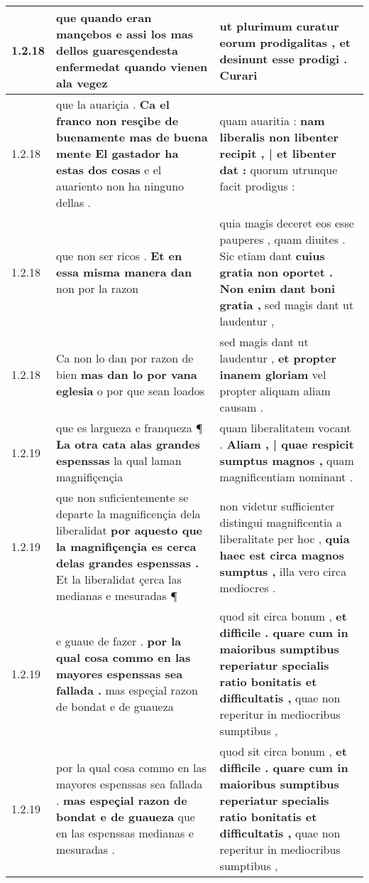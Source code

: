 \begin{tabular}{|p{1cm}|p{6.5cm}|p{6.5cm}|}
1.2.18 & que quando eran mançebos \textbf{ e assi los mas dellos guaresçendesta enfermedat } quando vienen ala vegez & ut plurimum curatur eorum prodigalitas , \textbf{ et desinunt esse prodigi . } Curari \\\hline
1.2.18 & que la auariçia . \textbf{ Ca el franco non resçibe de buenamente mas de buena mente El gastador ha estas dos cosas } e el auariento non ha ninguno dellas . & quam auaritia : \textbf{ nam liberalis non libenter recipit , | et libenter dat : } quorum utrunque facit prodigus : \\\hline
1.2.18 & que non ser ricos . \textbf{ Et en essa misma manera dan } non por la razon & quia magis deceret eos esse pauperes , quam diuites . Sic etiam dant \textbf{ cuius gratia non oportet . Non enim dant boni gratia , } sed magis dant ut laudentur , \\\hline
1.2.18 & Ca non lo dan por razon de bien \textbf{ mas dan lo por vana eglesia } o por que sean loados & sed magis dant ut laudentur , \textbf{ et propter inanem gloriam } vel propter aliquam aliam causam . \\\hline
1.2.19 & que es largueza e franqueza ¶ \textbf{ La otra cata alas grandes espenssas } la qual laman magnifiçençia & quam liberalitatem vocant . \textbf{ Aliam , | quae respicit sumptus magnos , } quam magnificentiam nominant . \\\hline
1.2.19 & que non suficientemente se departe la magnificençia dela liberalidat \textbf{ por aquesto que la magnifiçençia es cerca delas grandes espenssas . } Et la liberalidat çerca las medianas e mesuradas ¶ & non videtur sufficienter distingui magnificentia a liberalitate per hoc , \textbf{ quia haec est circa magnos sumptus , } illa vero circa mediocres . \\\hline
1.2.19 & e guaue de fazer . \textbf{ por la qual cosa commo en las mayores espenssas sea fallada . } mas espeçial razon de bondat e de guaueza & quod sit circa bonum , \textbf{ et difficile . quare cum in maioribus sumptibus reperiatur specialis ratio bonitatis et difficultatis , } quae non reperitur in mediocribus sumptibus , \\\hline
1.2.19 & por la qual cosa commo en las mayores espenssas sea fallada . \textbf{ mas espeçial razon de bondat e de guaueza } que en las espenssas medianas e mesuradas . & quod sit circa bonum , \textbf{ et difficile . quare cum in maioribus sumptibus reperiatur specialis ratio bonitatis et difficultatis , } quae non reperitur in mediocribus sumptibus , \\\hline

\end{tabular}
